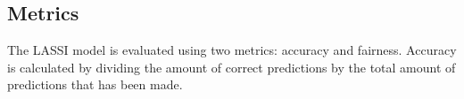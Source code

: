 




\subsection{Metrics}
The LASSI model is evaluated using two metrics: accuracy and fairness. Accuracy is calculated by dividing the amount of correct predictions by the total amount of predictions that has been made. 

